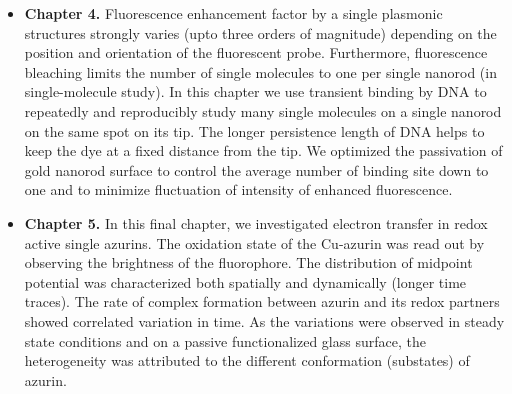 \documentclass[11pt,a4paper,onecolumn]{article}
\begin{document}
\begin{itemize}
	\item \textbf{Chapter 4.} Fluorescence enhancement factor by a single plasmonic structures strongly varies (upto three orders of magnitude) depending on the position and orientation of the fluorescent probe. Furthermore, fluorescence bleaching limits the number of single molecules to one per single nanorod (in single-molecule study). In this chapter we use transient binding by DNA to repeatedly and reproducibly study many single molecules on a single nanorod on the same spot on its tip. The longer persistence length of DNA helps to keep the dye at a fixed distance from the tip. We optimized the passivation of gold nanorod surface to control the average number of binding site down to one and to minimize fluctuation of intensity of enhanced fluorescence.

	\item \textbf{Chapter 5.} In this final chapter, we investigated electron transfer in redox active single azurins. The oxidation state of the Cu-azurin was read out by observing the brightness of the fluorophore. The distribution of midpoint potential was characterized both spatially and dynamically (longer time traces). The rate of complex formation between azurin and its redox partners showed correlated variation in time. As the variations were observed in steady state conditions and on a passive functionalized glass surface, the heterogeneity was attributed to the different conformation (substates) of azurin. 
\end{itemize}


\end{document}
